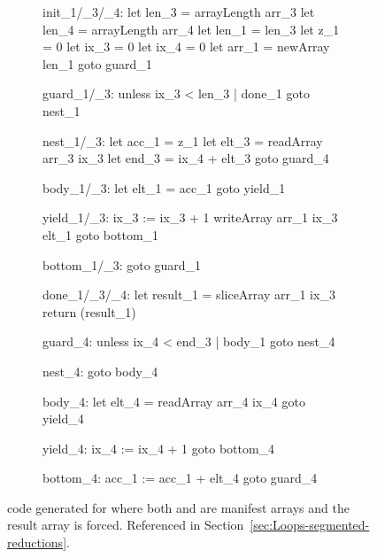 \documentclass[preamble.tex]{subfiles}
\begin{document}
\begin{figure}[ht!]

\begin{subfigure}{.55\textwidth}
\begin{loopcode}[%
  literate=
    {_1}{{\sub{fold}}}3
    {_3}{{\sub{segd}}}3
    {_4}{{\sub{data}}}3,
]
init_1/_3/_4:
  let len_3 = arrayLength arr_3
  let len_4 = arrayLength arr_4
  let len_1 = len_3
  let z_1 = 0
  let ix_3 = 0
  let ix_4 = 0
  let arr_1 = newArray len_1
  goto guard_1

guard_1/_3:
  unless ix_3 < len_3 | done_1
  goto nest_1

nest_1/_3:
  let acc_1 = z_1
  let elt_3 = readArray arr_3 ix_3
  let end_3 = ix_4 + elt_3
  goto guard_4

body_1/_3:
  let elt_1 = acc_1
  goto yield_1

yield_1/_3:
  ix_3 := ix_3 + 1
  writeArray arr_1 ix_3 elt_1
  goto bottom_1

bottom_1/_3:
  goto guard_1

done_1/_3/_4:
  let result_1 = sliceArray arr_1 ix_3
  return (result_1)
\end{loopcode}
\end{subfigure}%
%
\begin{subfigure}{.45\textwidth}
\begin{loopcode}[%
  literate=
    {_1}{{\sub{fold}}}3
    {_3}{{\sub{segd}}}3
    {_4}{{\sub{data}}}3,
]
guard_4:
  unless ix_4 < end_3 | body_1
  goto nest_4

nest_4:
  goto body_4

body_4:
  let elt_4 = readArray arr_4 ix_4
  goto yield_4

yield_4:
  ix_4 := ix_4 + 1
  goto bottom_4

bottom_4:
  acc_1 := acc_1 + elt_4
  goto guard_4
\end{loopcode}
\end{subfigure}

\caption{\Loop code generated for  where both  and  are manifest arrays and the result array is forced. Referenced in Section~\protect\ref{sec:Loops-segmented-reductions}.}
\label{fig:Loop-fold-s-complete}
\end{figure}
\end{document}
